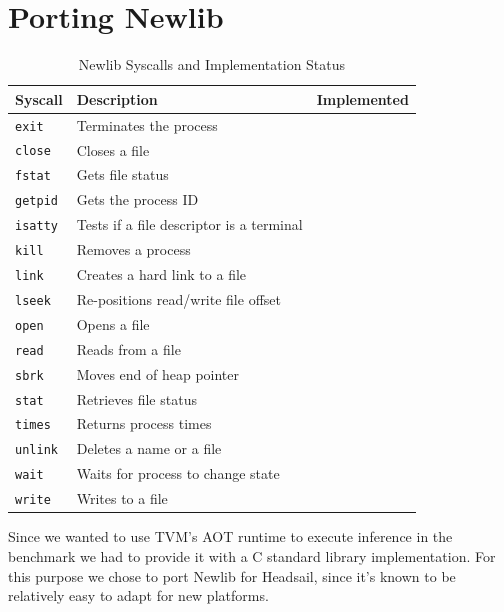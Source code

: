 \documentclass[12pt,a4paper,english
]{tunithesis}
\def\checkmark{\tikz\fill[scale=0.4](0,.35) -- (.25,0) -- (1,.7) -- (.25,.15) -- cycle;}
\def\scalecheck{\resizebox{\widthof{\checkmark}*\ratio{\widthof{x}}{\widthof{\normalsize x}}}{!}{\checkmark}}
\begin{document}
\section{Porting Newlib}
\label{sec:newlib}

\begin{table}[]
\centering
\begin{tabular}{|l|l|c|}
\hline
\textbf{Syscall}       & \textbf{Description}               & \textbf{Implemented} \\ \hline
\texttt{exit}         & Terminates the process             & \scalecheck                       \\ \hline
\texttt{close}         & Closes a file                      &                        \\ \hline
\texttt{fstat}         & Gets file status                   & \scalecheck                       \\ \hline
\texttt{getpid}        & Gets the process ID                &                        \\ \hline
\texttt{isatty}        & Tests if a file descriptor is a terminal & \scalecheck                 \\ \hline
\texttt{kill}          & Removes a process                    &                        \\ \hline
\texttt{link}          & Creates a hard link to a file      &                        \\ \hline
\texttt{lseek}         & Re-positions read/write file offset &                        \\ \hline
\texttt{open}          & Opens a file                       &                        \\ \hline
\texttt{read}          & Reads from a file                  & \scalecheck                       \\ \hline
\texttt{sbrk}          & Moves end of heap pointer          & \scalecheck                       \\ \hline
\texttt{stat}          & Retrieves file status              &                        \\ \hline
\texttt{times}         & Returns process times              &                        \\ \hline
\texttt{unlink}        & Deletes a name or a file           &                        \\ \hline
\texttt{wait}          & Waits for process to change state  &                        \\ \hline
\texttt{write}         & Writes to a file                   & \scalecheck                       \\ \hline
\end{tabular}
\caption{Newlib Syscalls and Implementation Status}
\label{tab:newlib_syscalls}
\end{table}
Since we wanted to use TVM's AOT runtime to execute inference in the benchmark we had to provide it with a C standard library implementation. For this purpose we chose to port Newlib for Headsail, since it's known to be relatively easy to adapt for new platforms.
\end{document}
